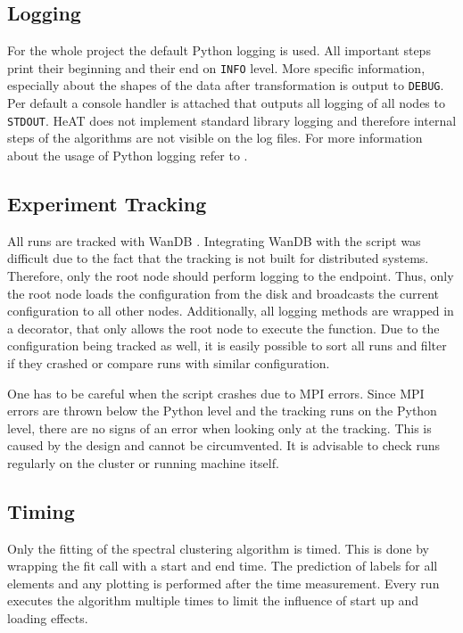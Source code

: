 \subsection{Logging}
\label{subsec:logging}
For the whole project the default Python logging \cite{noauthor_pep_nodate} is used.
All important steps print their beginning and their end on \lstinline{INFO} level.
More specific information, especially about the shapes of the data after transformation is output to \lstinline{DEBUG}.
Per default a console handler is attached that outputs all logging of all nodes to \lstinline{STDOUT}.
\gls{HeAT} does not implement standard library logging and therefore internal steps of the algorithms are not visible on the log files.
For more information about the usage of Python logging refer to \cite{noauthor_pep_nodate}.


\subsection{Experiment Tracking}
\label{subsec:experiment_tracking}
All runs are tracked with WanDB \cite{noauthor_weights_nodate}. Integrating WanDB with the script was difficult due
to the fact that the tracking is not built for distributed systems. Therefore, only the root node should perform
logging to the endpoint.
Thus, only the root node loads the configuration from the disk and broadcasts the current configuration
to all other nodes.
Additionally, all logging methods are wrapped in a decorator, that only allows the root node to execute the function.
Due to the configuration being tracked as well, it is easily possible to sort all runs and filter if they crashed or
compare runs with similar configuration.

One has to be careful when the script crashes due to \gls{MPI} errors. Since \gls{MPI} errors are thrown
below the Python level and the tracking runs on the Python level, there are no signs of an error when looking only at
the tracking. This is caused by the design and cannot be circumvented. It is advisable to check runs regularly on
the cluster or running machine itself.

\subsection{Timing}
\label{subsec:timing}
Only the fitting of the spectral clustering algorithm is timed. This is done by wrapping the fit call with a start
and end time. The prediction of labels for all elements and any plotting is performed after the time measurement.
Every run executes the algorithm multiple times to limit the influence of start up and loading effects.

